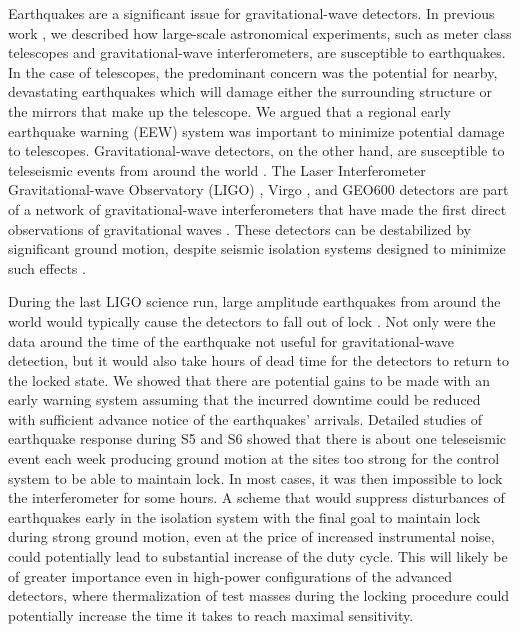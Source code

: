 \documentclass[reprint, prl, aps, showpacs]{revtex4-1}
\begin{document}
Earthquakes are a significant issue for gravitational-wave detectors. In previous work \cite{CoSt2015}, we described how large-scale astronomical experiments, such as meter class telescopes and gravitational-wave interferometers, are susceptible to earthquakes. In the case of telescopes, the predominant concern was the potential for nearby, devastating earthquakes which will damage either the surrounding structure or the mirrors that make up the telescope. We argued that a regional early earthquake warning (EEW) \cite{Al2012,KuAl2013a,KuAl2013b,KuHe2014,CoLa2009a,CoLa2009b,BoAl2014,HoKa2008} system was important to minimize potential damage to telescopes. 
Gravitational-wave detectors, on the other hand, are susceptible to teleseismic events from around the world \cite{MaFa2012}. 
The Laser Interferometer Gravitational-wave Observatory (LIGO) \cite{aligo}, Virgo \cite{avirgo}, and GEO600 \cite{Gr2010} detectors are part of a network of gravitational-wave interferometers that have made the first direct observations of gravitational waves \cite{AbEA2016a,AbEA2016e}. These detectors can be destabilized by significant ground motion, despite seismic isolation systems designed to minimize such effects \cite{AbAd2002,StAb2009,MaLa2015}.

During the last LIGO science run, large amplitude earthquakes from around the world would typically cause the detectors to fall out of lock \cite{CoSt2015}. Not only were the data around the time of the earthquake not useful for gravitational-wave detection, but it would also take hours of dead time for the detectors to return to the locked state. 
We showed that there are potential gains to be made with an early warning system assuming that the incurred downtime could be reduced with sufficient advance notice of the earthquakes' arrivals.
Detailed studies of earthquake response during S5 and S6 showed that there is about one teleseismic event each week producing ground motion at the sites too strong for the control system to be able to maintain lock. In most cases, it was then impossible to lock the interferometer for some hours. A scheme that would suppress disturbances of earthquakes early in the isolation system with the final goal to maintain lock during strong ground motion, even at the price of increased instrumental noise, could potentially lead to substantial increase of the duty cycle. This will likely be of greater importance even in high-power configurations of the advanced detectors, where thermalization of test masses during the locking procedure could potentially increase the time it takes to reach maximal sensitivity.
\end{document}
